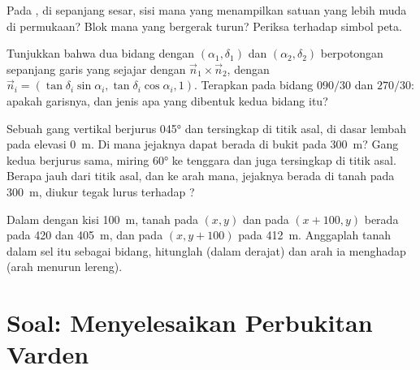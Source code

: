 \begin{exercise}[$\star\star$]\label{exo:b1:geological-maps:9}
Pada , di sepanjang sesar, sisi mana yang menampilkan satuan yang lebih muda di permukaan? Blok mana yang bergerak turun? Periksa terhadap simbol peta.
\end{exercise}

\begin{exercise}[$\star\star\star$]\label{exo:b1:geological-maps:10}
Tunjukkan bahwa dua bidang dengan  $(\alpha_1, \delta_1)$ dan
$(\alpha_2, \delta_2)$ berpotongan sepanjang garis yang sejajar dengan $\vec n_1 \times \vec n_2$, dengan $\vec n_i = (\tan\delta_i\sin\alpha_i,
\tan\delta_i\cos\alpha_i, 1)$. Terapkan pada bidang $090/30$ dan $270/30$: apakah garisnya, dan  jenis apa yang dibentuk kedua bidang itu?
\end{exercise}

\begin{exercise}[$\star\star\star$]\label{exo:b1:geological-maps:11}
Sebuah gang vertikal berjurus \ang{045} dan tersingkap di titik asal, di dasar lembah pada elevasi \qty{0}{m}. Di mana jejaknya dapat berada di bukit pada \qty{300}{m}? Gang kedua berjurus sama, miring \ang{60} ke tenggara dan juga tersingkap di titik asal. Berapa jauh dari titik asal, dan ke arah mana, jejaknya berada di tanah pada \qty{300}{m}, diukur tegak lurus terhadap ?
\end{exercise}

\begin{exercise}[$\star\star\star$]\label{exo:b1:geological-maps:12}
Dalam  dengan kisi \qty{100}{m}, tanah pada $(x, y)$ dan pada $(x + 100, y)$ berada pada 420 dan \qty{405}{m}, dan pada $(x, y + 100)$ pada \qty{412}{m}. Anggaplah tanah dalam sel itu sebagai bidang, hitunglah  (dalam derajat) dan  arah ia menghadap (arah menurun lereng).
\end{exercise}

\section{Soal: Menyelesaikan Perbukitan Varden}

